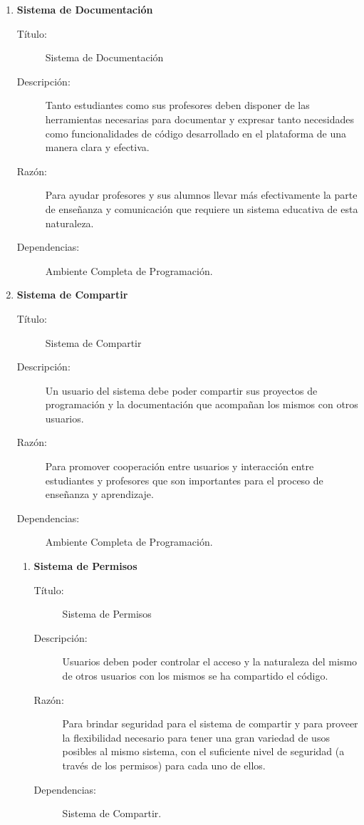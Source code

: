 \begin{enumerate}
\begin{enumerate}
\begin{description}
		\end{description}
		\item \textbf{Sistema de Documentación}
		\begin{description}
			\item[Título:] Sistema de Documentación
			\item[Descripción:] Tanto estudiantes como sus profesores deben disponer de las herramientas necesarias para documentar y expresar tanto necesidades como funcionalidades de código desarrollado en el plataforma de una manera clara y efectiva.
			\item[Razón:] Para ayudar profesores y sus alumnos llevar más efectivamente la parte de enseñanza y comunicación que requiere un sistema educativa de esta naturaleza.
			\item[Dependencias:] Ambiente Completa de Programación.
		\end{description}
		\item \textbf{Sistema de Compartir}
		\begin{description}
			\item[Título:] Sistema de Compartir
			\item[Descripción:] Un usuario del sistema debe poder compartir sus proyectos de programación y la documentación que acompañan los mismos con otros usuarios.
			\item[Razón:] Para promover cooperación entre usuarios y interacción entre estudiantes y profesores que son importantes para el proceso de enseñanza y aprendizaje.
			\item[Dependencias:] Ambiente Completa de Programación.
		\end{description}
        \begin{enumerate}
			\item \textbf{Sistema de Permisos}
            \begin{description}
			\item[Título:] Sistema de Permisos
			\item[Descripción:] Usuarios deben poder controlar el acceso y la naturaleza del mismo de otros usuarios con los mismos se ha compartido el código.
			\item[Razón:] Para brindar seguridad para el sistema de compartir y para proveer la flexibilidad necesario para tener una gran variedad de usos posibles al mismo sistema, con el suficiente nivel de seguridad (a través de los permisos) para cada uno de ellos.
			\item[Dependencias:] Sistema de Compartir.

\end{description}
\end{enumerate}
\end{enumerate}
\end{enumerate}
